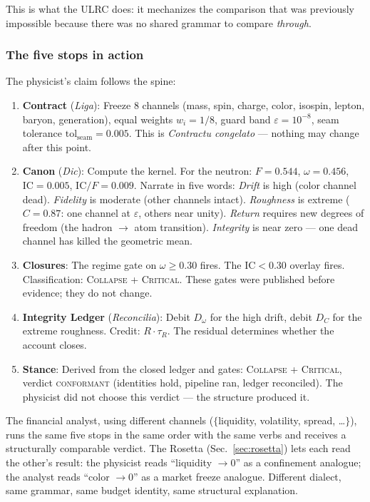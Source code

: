 \documentclass[
  aps,
  prd,
  twocolumn,
  superscriptaddress,
  nofootinbib,
  floatfix
]{revtex4-2}
\newcommand{\tR}{\tau_{\!R}}
\newcommand{\eps}{\varepsilon}
\newcommand{\tolseam}{\mathrm{tol}_{\mathrm{seam}}}
\newcommand{\regime}[1]{\textrm{\upshape\scshape#1}}
\newcommand{\conform}{\regime{conformant}}
\newcommand{\Fid}{F}
\newcommand{\Drft}{\omega}
\newcommand{\Curv}{C}
\newcommand{\IC}{\mathrm{IC}}
\newcommand{\lat}[1]{\textit{#1}}
\begin{document}
This is what the ULRC does: it mechanizes the comparison that
was previously impossible because there was no shared grammar
to compare \emph{through}.

\subsubsection{The five stops in action}

The physicist's claim follows the spine:

\begin{enumerate}[nosep,leftmargin=*]
\item \textbf{Contract} (\lat{Liga}): Freeze 8 channels
  (mass, spin, charge, color, isospin, lepton, baryon,
  generation), equal weights $w_i = 1/8$, guard band
  $\eps = 10^{-8}$, seam tolerance $\tolseam = 0.005$.
  This is \lat{Contractu congelato} --- nothing may change
  after this point.
\item \textbf{Canon} (\lat{Dic}): Compute the kernel.
  For the neutron: $\Fid = 0.544$, $\Drft = 0.456$,
  $\IC = 0.005$, $\IC/\Fid = 0.009$. Narrate in five words:
  \emph{Drift} is high (color channel dead). \emph{Fidelity}
  is moderate (other channels intact). \emph{Roughness} is
  extreme ($\Curv = 0.87$: one channel at $\eps$, others
  near unity). \emph{Return} requires new degrees of freedom
  (the hadron $\to$ atom transition). \emph{Integrity} is
  near zero --- one dead channel has killed the geometric mean.
\item \textbf{Closures}: The regime gate on $\Drft \geq 0.30$
  fires. The $\IC < 0.30$ overlay fires. Classification:
  \regime{Collapse} + \regime{Critical}. These gates were
  published before evidence; they do not change.
\item \textbf{Integrity Ledger} (\lat{Reconcilia}): Debit
  $D_\Drft$ for the high drift, debit $D_\Curv$ for the
  extreme roughness. Credit: $R \cdot \tR$. The residual
  determines whether the account closes.
\item \textbf{Stance}: Derived from the closed ledger and
  gates: \regime{Collapse} + \regime{Critical}, verdict
  \conform{} (identities hold, pipeline ran, ledger
  reconciled). The physicist did not choose this verdict ---
  the structure produced it.
\end{enumerate}

\noindent
The financial analyst, using different channels
($\{$liquidity, volatility, spread, \ldots$\}$), runs the
same five stops in the same order with the same verbs and
receives a structurally comparable verdict. The Rosetta
(Sec.~\ref{sec:rosetta}) lets each read the other's result:
the physicist reads ``liquidity $\to 0$'' as a confinement
analogue; the analyst reads ``color $\to 0$'' as a market
freeze analogue. Different dialect, same grammar, same
budget identity, same structural explanation.
\end{document}
